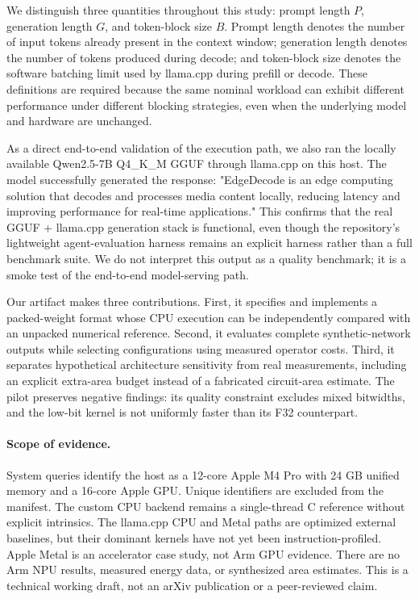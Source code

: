 \documentclass[11pt]{article}
\begin{document}
We distinguish three quantities throughout this study: prompt length $P$,
generation length $G$, and token-block size $B$. Prompt length denotes the number
of input tokens already present in the context window; generation length denotes
the number of tokens produced during decode; and token-block size denotes the
software batching limit used by llama.cpp during prefill or decode. These
definitions are required because the same nominal workload can exhibit different
performance under different blocking strategies, even when the underlying model and
hardware are unchanged.

As a direct end-to-end validation of the execution path, we also ran the locally
available Qwen2.5-7B Q4\_K\_M GGUF through llama.cpp on this host. The model
successfully generated the response: "EdgeDecode is an edge computing solution
that decodes and processes media content locally, reducing latency and improving
performance for real-time applications." This confirms that the real GGUF +
llama.cpp generation stack is functional, even though the repository's lightweight
agent-evaluation harness remains an explicit harness rather than a full benchmark
suite. We do not interpret this output as a quality benchmark; it is a smoke test
of the end-to-end model-serving path.

Our artifact makes three contributions. First, it specifies and implements a
packed-weight format whose CPU execution can be independently compared with an
unpacked numerical reference. Second, it evaluates complete synthetic-network
outputs while selecting configurations using measured operator costs. Third, it
separates hypothetical architecture sensitivity from real measurements, including
an explicit extra-area budget instead of a fabricated circuit-area estimate. The
pilot preserves negative findings: its quality constraint excludes mixed bitwidths,
and the low-bit kernel is not uniformly faster than its F32 counterpart.

\paragraph{Scope of evidence.}
System queries identify the host as a 12-core Apple M4 Pro with 24 GB unified memory
and a 16-core Apple GPU. Unique identifiers are excluded from the manifest. The
custom CPU backend remains a single-thread C reference without explicit intrinsics.
The llama.cpp CPU and Metal paths are optimized external baselines, but their
dominant kernels have not yet been instruction-profiled. Apple Metal is an
accelerator case study, not Arm GPU evidence. There are no Arm NPU results,
measured energy data, or synthesized area estimates. This is a technical working
draft, not an arXiv publication or a peer-reviewed claim.
\end{document}
